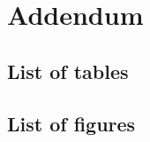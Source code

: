 \chapter{Addendum}

\begingroup
  \renewcommand{\chapter}[2]{}
  \section{List of tables}
  \listoftables
  \section{List of figures}
  \listoffigures
\endgroup

